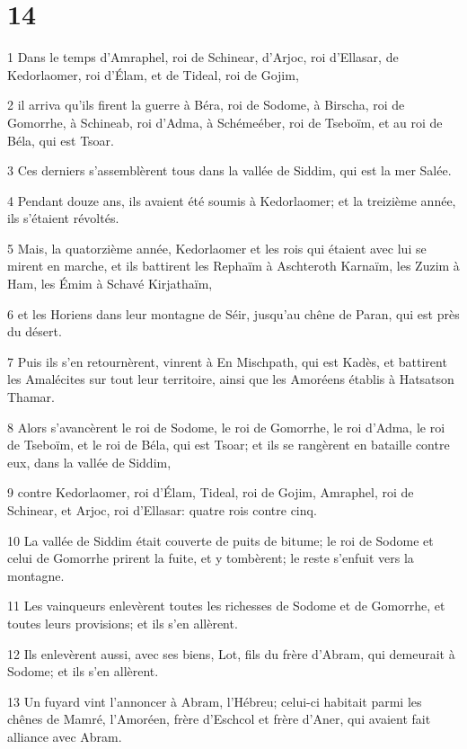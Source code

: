 \chapter{14}

\par 1 Dans le temps d'Amraphel, roi de Schinear, d'Arjoc, roi d'Ellasar, de Kedorlaomer, roi d'Élam, et de Tideal, roi de Gojim,
\par 2 il arriva qu'ils firent la guerre à Béra, roi de Sodome, à Birscha, roi de Gomorrhe, à Schineab, roi d'Adma, à Schémeéber, roi de Tseboïm, et au roi de Béla, qui est Tsoar.
\par 3 Ces derniers s'assemblèrent tous dans la vallée de Siddim, qui est la mer Salée.
\par 4 Pendant douze ans, ils avaient été soumis à Kedorlaomer; et la treizième année, ils s'étaient révoltés.
\par 5 Mais, la quatorzième année, Kedorlaomer et les rois qui étaient avec lui se mirent en marche, et ils battirent les Rephaïm à Aschteroth Karnaïm, les Zuzim à Ham, les Émim à Schavé Kirjathaïm,
\par 6 et les Horiens dans leur montagne de Séir, jusqu'au chêne de Paran, qui est près du désert.
\par 7 Puis ils s'en retournèrent, vinrent à En Mischpath, qui est Kadès, et battirent les Amalécites sur tout leur territoire, ainsi que les Amoréens établis à Hatsatson Thamar.
\par 8 Alors s'avancèrent le roi de Sodome, le roi de Gomorrhe, le roi d'Adma, le roi de Tseboïm, et le roi de Béla, qui est Tsoar; et ils se rangèrent en bataille contre eux, dans la vallée de Siddim,
\par 9 contre Kedorlaomer, roi d'Élam, Tideal, roi de Gojim, Amraphel, roi de Schinear, et Arjoc, roi d'Ellasar: quatre rois contre cinq.
\par 10 La vallée de Siddim était couverte de puits de bitume; le roi de Sodome et celui de Gomorrhe prirent la fuite, et y tombèrent; le reste s'enfuit vers la montagne.
\par 11 Les vainqueurs enlevèrent toutes les richesses de Sodome et de Gomorrhe, et toutes leurs provisions; et ils s'en allèrent.
\par 12 Ils enlevèrent aussi, avec ses biens, Lot, fils du frère d'Abram, qui demeurait à Sodome; et ils s'en allèrent.
\par 13 Un fuyard vint l'annoncer à Abram, l'Hébreu; celui-ci habitait parmi les chênes de Mamré, l'Amoréen, frère d'Eschcol et frère d'Aner, qui avaient fait alliance avec Abram.
